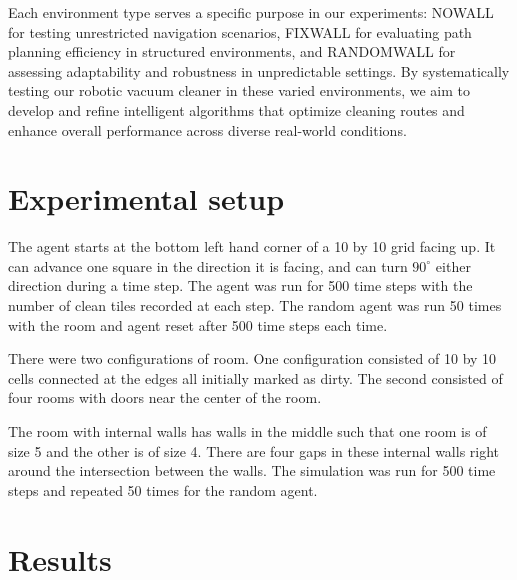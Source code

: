 \documentclass{article}
\begin{document}
Each environment type serves a specific purpose in our experiments: NOWALL for testing unrestricted navigation scenarios, FIXWALL for evaluating path planning efficiency in structured environments, and RANDOMWALL for assessing adaptability and robustness in unpredictable settings. By systematically testing our robotic vacuum cleaner in these varied environments, we aim to develop and refine intelligent algorithms that optimize cleaning routes and enhance overall performance across diverse real-world conditions.


\section{Experimental setup}
The agent starts at the bottom left hand corner of a 10 by 10 grid facing up. It can advance one square in the direction it is facing, and can turn $90^\circ$ either direction during a time step. The agent was run for 500 time steps with the number of clean tiles recorded at each step. The random agent was run 50 times with the room and agent reset after 500 time steps each time.

There were two configurations of room. One configuration consisted of 10 by 10 cells connected at the edges  all initially marked as dirty. The second consisted of four rooms with doors near the center of the room. 


The room with internal walls has walls in the middle such that one room is of size 5 and the other is of size 4. There are four gaps in these internal walls right around the intersection between the walls.  The simulation was run for 500 time steps and repeated 50 times for the random agent. 




\section{Results}
\end{document}
